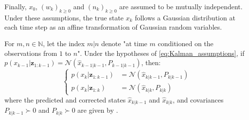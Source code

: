Finally, $x_0$, $(w_k)_{k\geq0}$ and $(n_k)_{k\geq0}$ are assumed to be mutually independent. Under these assumptions, the true state $x_k$ follows a Gaussian distribution at each time step as an affine transformation of Gaussian random variables.

\begin{proposition}
	For $m,n\in\mathbb{N}$, let the index $m|n$ denote "at time $m$ conditioned on the observations from $1$ to $n$". Under the hypotheses of \eqref{eq:Kalman_assumptions}, if $p(x_{k-1}|\mathbf{z}_{1:k-1})=\mathcal{N}\left(\hat{x}_{k-1|k-1},P_{k-1|k-1}\right)$, then:
	\begin{equation}
		\left\{\begin{aligned}
		p(x_k|\mathbf{z}_{1:k-1})&=\mathcal{N}\left(\hat{x}_{k|k-1},P_{k|k-1}\right)\\
		p(x_k|\mathbf{z}_{1:k})&=\mathcal{N}\left(\hat{x}_{k|k},P_{k|k}\right)
		\end{aligned}\right.
	\end{equation}
	where the predicted and corrected states $\hat{x}_{k|k-1}$ and $\hat{x}_{k|k}$, and covariances $P_{k|k-1}\succ0$ and $P_{k|k}\succ0$ are given by .
\end{proposition}

